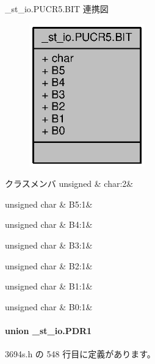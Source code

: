 \+\_\+st\+\_\+io.\+P\+U\+C\+R5.\+B\+I\+T 連携図
\nopagebreak
\begin{figure}[H]
\begin{center}
\leavevmode
\includegraphics[width=142pt]{de/da9/struct__st__io_8PUCR5_8BIT__coll__graph}
\end{center}
\end{figure}
\begin{DoxyFields}{クラスメンバ}
unsigned\label{3694s_8h_aa87deb01c5f539e6bda34829c8ef2368}
&
char\+:2&
\\
\hline

unsigned char\label{3694s_8h_a2a1ab298edf0162a3305e599b47cbeee}
&
B5\+:1&
\\
\hline

unsigned char\label{3694s_8h_ad5d4cc7b09d1843517acc9361f8f665e}
&
B4\+:1&
\\
\hline

unsigned char\label{3694s_8h_a0c4ecd7b59ebc5b9f47974cb9845fd02}
&
B3\+:1&
\\
\hline

unsigned char\label{3694s_8h_abbd97b00c539801e32317ab550867ec4}
&
B2\+:1&
\\
\hline

unsigned char\label{3694s_8h_ac9512565ef6194ca664dc41ec0de7a53}
&
B1\+:1&
\\
\hline

unsigned char\label{3694s_8h_a4c769c2c9989abb9fa024ab9930270e5}
&
B0\+:1&
\\
\hline

\end{DoxyFields}
\label{union__st__io_8PDR1}
\paragraph{union \+\_\+st\+\_\+io.\+P\+D\+R1}


 3694s.\+h の 548 行目に定義があります。



